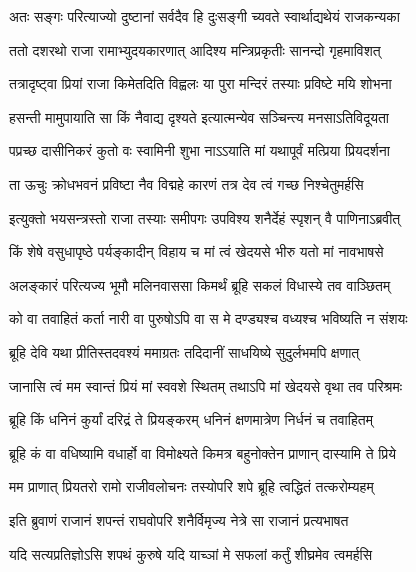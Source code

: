 \twolineshloka
{अतः सङ्गः परित्याज्यो दुष्टानां सर्वदैव हि}
{दुःसङ्गी च्यवते स्वार्थाद्यथेयं राजकन्यका} %





\twolineshloka
{ततो दशरथो राजा रामाभ्युदयकारणात्}
{आदिश्य मन्त्रिप्रकृतीः सानन्दो गृहमाविशत्} %

\twolineshloka
{तत्रादृष्ट्वा प्रियां राजा किमेतदिति विह्वलः}
{या पुरा मन्दिरं तस्याः प्रविष्टे मयि शोभना} %

\twolineshloka
{हसन्ती मामुपायाति सा किं नैवाद्य दृश्यते}
{इत्यात्मन्येव सञ्चिन्त्य मनसाऽतिविदूयता} %

\twolineshloka
{पप्रच्छ दासीनिकरं कुतो वः स्वामिनी शुभा}
{नाऽऽयाति मां यथापूर्वं मत्प्रिया प्रियदर्शना} %

\twolineshloka
{ता ऊचुः क्रोधभवनं प्रविष्टा नैव विद्महे}
{कारणं तत्र देव त्वं गच्छ निश्चेतुमर्हसि} %

\twolineshloka
{इत्युक्तो भयसन्त्रस्तो राजा तस्याः समीपगः}
{उपविश्य शनैर्देहं स्पृशन् वै पाणिनाऽब्रवीत्} %

\twolineshloka
{किं शेषे वसुधापृष्ठे पर्यङ्कादीन् विहाय च}
{मां त्वं खेदयसे भीरु यतो मां नावभाषसे} %

\twolineshloka
{अलङ्कारं परित्यज्य भूमौ मलिनवाससा}
{किमर्थं ब्रूहि सकलं विधास्ये तव वाञ्छितम्} %

\twolineshloka
{को वा तवाहितं कर्ता नारी वा पुरुषोऽपि वा}
{स मे दण्ड्यश्च वध्यश्च भविष्यति न संशयः} %

\twolineshloka
{ब्रूहि देवि यथा प्रीतिस्तदवश्यं ममाग्रतः}
{तदिदानीं साधयिष्ये सुदुर्लभमपि क्षणात्} %

\twolineshloka
{जानासि त्वं मम स्वान्तं प्रियं मां स्ववशे स्थितम्}
{तथाऽपि मां खेदयसे वृथा तव परिश्रमः} %

\twolineshloka
{ब्रूहि किं धनिनं कुर्यां दरिद्रं ते प्रियङ्करम्}
{धनिनं क्षणमात्रेण निर्धनं च तवाहितम्} %

\twolineshloka
{ब्रूहि कं वा वधिष्यामि वधार्हो वा विमोक्ष्यते}
{किमत्र बहुनोक्तेन प्राणान् दास्यामि ते प्रिये} %

\twolineshloka
{मम प्राणात् प्रियतरो रामो राजीवलोचनः}
{तस्योपरि शपे ब्रूहि त्वद्धितं तत्करोम्यहम्} %

\twolineshloka
{इति ब्रुवाणं राजानं शपन्तं राघवोपरि}
{शनैर्विमृज्य नेत्रे सा राजानं प्रत्यभाषत} %

\twolineshloka
{यदि सत्यप्रतिज्ञोऽसि शपथं कुरुषे यदि}
{याच्ञां मे सफलां कर्तुं शीघ्रमेव त्वमर्हसि} %

